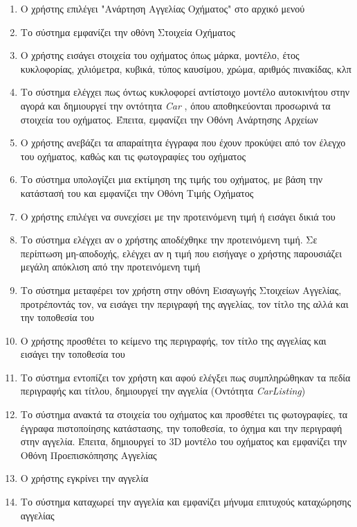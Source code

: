 \documentclass{../ol-softwaremanual}
\begin{document}
\begin{enumerate}
	
	\item Ο χρήστης επιλέγει \en"\gr Ανάρτηση Αγγελίας Οχήματος\en" \gr στο αρχικό μενού
	\item Το σύστημα εμφανίζει την οθόνη Στοιχεία Οχήματος
	\item Ο χρήστης εισάγει στοιχεία του οχήματος όπως μάρκα, μοντέλο, έτος κυκλοφορίας, χιλιόμετρα, κυβικά, τύπος καυσίμου, χρώμα, αριθμός πινακίδας, κλπ
	\item Το σύστημα ελέγχει πως όντως κυκλοφορεί αντίστοιχο μοντέλο αυτοκινήτου στην αγορά και δημιουργεί την οντότητα \en \textit{Car} \gr, όπου αποθηκεύονται προσωρινά τα στοιχεία του οχήματος. Έπειτα, εμφανίζει την Οθόνη Ανάρτησης Αρχείων
	\item Ο χρήστης ανεβάζει τα απαραίτητα έγγραφα που έχουν προκύψει από τον έλεγχο του οχήματος, καθώς και τις φωτογραφίες του οχήματος
	\item Το σύστημα υπολογίζει μια εκτίμηση της τιμής του οχήματος, με βάση την κατάστασή του και εμφανίζει την Οθόνη Τιμής Οχήματος
	\item Ο χρήστης επιλέγει να συνεχίσει με την προτεινόμενη τιμή ή εισάγει δικιά του
	\item Το σύστημα ελέγχει αν ο χρήστης αποδέχθηκε την προτεινόμενη τιμή. Σε περίπτωση μη-αποδοχής, ελέγχει αν η τιμή που εισήγαγε ο χρήστης παρουσιάζει μεγάλη απόκλιση από την προτεινόμενη τιμή
	\item Το σύστημα μεταφέρει τον χρήστη στην οθόνη Εισαγωγής Στοιχείων Αγγελίας, προτρέποντάς τον, να εισάγει την περιγραφή της αγγελίας, τον τίτλο της αλλά και την τοποθεσία του
	\item Ο χρήστης προσθέτει το κείμενο της περιγραφής, τον τίτλο της αγγελίας και εισάγει την τοποθεσία του
	\item Το σύστημα εντοπίζει τον χρήστη και αφού ελέγξει πως συμπληρώθηκαν τα πεδία περιγραφής και τίτλου, δημιουργεί την αγγελία (Οντότητα \en \textit{CarListing}\gr)
	\item Το σύστημα ανακτά τα στοιχεία του οχήματος και προσθέτει τις φωτογραφίες, τα έγγραφα πιστοποίησης κατάστασης, την τοποθεσία, το όχημα και την περιγραφή στην αγγελία. Έπειτα, δημιουργεί το  \en 3D \gr μοντέλο του οχήματος και εμφανίζει την Οθόνη Προεπισκόπησης Αγγελίας
	\item Ο χρήστης εγκρίνει την αγγελία
	\item Το σύστημα καταχωρεί την αγγελία και εμφανίζει μήνυμα επιτυχούς καταχώρησης αγγελίας
\end{enumerate}
\end{document}
